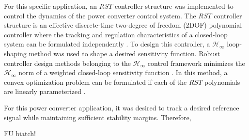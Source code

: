 \documentclass[11pt,english]{article}
\begin{document}
For this specific application, an $RST$ controller structure was implemented to control the dynamics of the power converter control system. The $RST$ controller structure is an effective discrete-time two-degree of freedom (2DOF) polynomial controller where the tracking and regulation characteristics of a closed-loop system can be formulated independently \cite{LZ06}. To design this controller, a $\mathcal{H}_\infty$ loop-shaping method was used to shape a desired sensitivity function. Robust controller design methods belonging to the $\mathcal{H}_{\infty}$ control framework minimizes the $\mathcal{H}_{\infty}$ norm of a weighted closed-loop sensitivity function \cite{ZD98}. In this method, a convex optimization problem can be formulated if each of the $RST$ polynomials are linearly parameterized \cite{NEK15}. 

For this power converter application, it was desired to track a desired reference signal while maintaining sufficient stability margins. Therefore, 


FU biatch!

\end{document}
